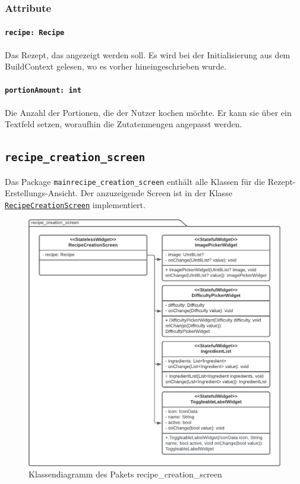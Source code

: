 \documentclass{entwurfsheft}
\begin{document}
\begin{sloppypar}
\subsubsection*{Attribute}
\paragraph{\texttt{recipe: Recipe}}
Das Rezept, das angezeigt werden soll. Es wird bei der Initialisierung aus dem \Gls{BuildContext} gelesen, wo es vorher hineingeschrieben wurde.
\paragraph{\texttt{portionAmount: int}}
Die Anzahl der Portionen, die der Nutzer kochen möchte. Er kann sie über ein Textfeld setzen, woraufhin die Zutatenmengen angepasst werden.
\newpage

\subsection{\texttt{recipe\_creation\_screen}}
Das Package \texttt{mainrecipe\_creation\_screen} enthält alle Klassen für die Rezept-Erstellungs-Ansicht. Der anzuzeigende Screen ist in der Klasse \hyperref[sec:recipeCreationScreen]{\texttt{RecipeCreationScreen}} implementiert.
\begin{figure}
    [htp]
    \centering
    \includegraphics[width=\textwidth]{images/presentationLayer/classDiagrams/recipeCreationScreenWhole.pdf}
    \caption{Klassendiagramm des Pakets recipe\_creation\_screen}
\end{figure}
\newpage

\end{sloppypar}
\end{document}
